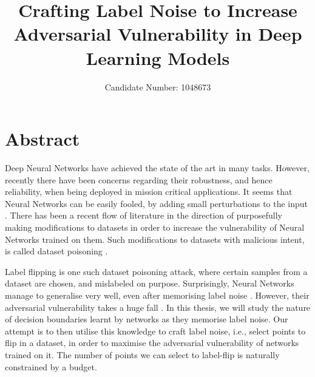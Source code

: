 \documentclass{ociamthesis}
\title{Crafting Label Noise to Increase Adversarial Vulnerability in Deep
Learning Models}
\author{Candidate Number: 1048673}
\date{}
\begin{document}
\maketitle


\chapter*{Abstract}
Deep Neural Networks have achieved the state of the art in many tasks. However,
recently there have been concerns regarding their robustness, and hence
reliability, when being deployed in mission critical applications. It seems that
Neural Networks can be easily fooled, by adding small perturbations to the input
\citep{42503}. There has been a recent flow of literature in the direction of
purposefully making modifications to datasets in order to increase the
vulnerability of Neural Networks trained on them. Such modifications to datasets
with malicious intent, is called dataset poisoning \citep{just-how-toxic,
DBLP:journals/corr/abs-1712-05526}.

Label flipping is one such dataset poisoning attack, where certain samples from
a dataset are chosen, and mislabeled on purpose. Surprisingly, Neural Networks
manage to generalise very well, even after memorising label noise
\citep{belkin2018understand}. However, their adversarial vulnerability takes a
huge fall \citep{sanyal2021how}. In this thesis, we will study the nature of
decision boundaries learnt by networks as they memorise label noise. Our attempt
is to then utilise this knowledge to craft label noise, i.e., select points to
flip in a dataset, in order to maximise the adversarial vulnerability of
networks trained on it. The number of points we can select to label-flip is
naturally constrained by a budget. 
\end{document}
